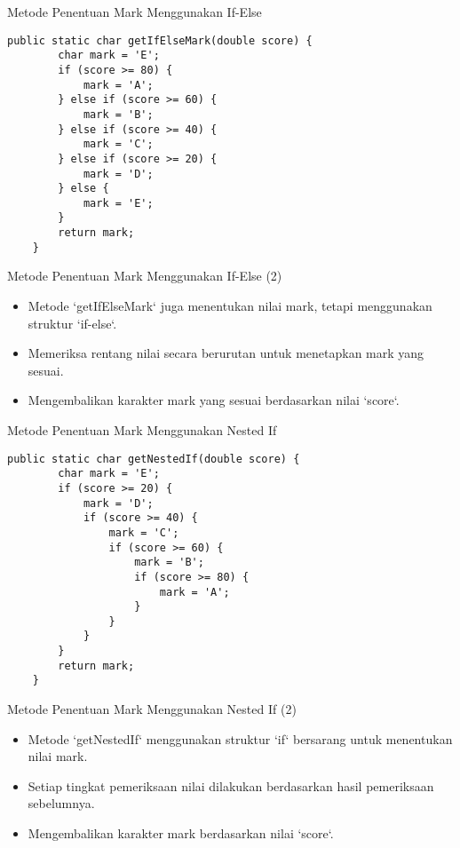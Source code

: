\documentclass[aspectratio=169, table]{beamer}
\begin{document}
\begin{frame}[fragile]{\Large{Metode Penentuan Mark Menggunakan If-Else}}
\vspace{20pt}
\begin{lstlisting}[style=JavaStyle]
	public static char getIfElseMark(double score) {
		char mark = 'E';
		if (score >= 80) {
			mark = 'A';
		} else if (score >= 60) {
			mark = 'B';
		} else if (score >= 40) {
			mark = 'C';
		} else if (score >= 20) {
			mark = 'D';
		} else {
			mark = 'E';
		}
		return mark;
	}
\end{lstlisting}
\end{frame}

\begin{frame}[fragile]{\Large{Metode Penentuan Mark Menggunakan If-Else (2)}}
\vspace{20pt}
\begin{itemize}
	\item Metode `getIfElseMark` juga menentukan nilai mark, tetapi menggunakan struktur `if-else`.
	\item Memeriksa rentang nilai secara berurutan untuk menetapkan mark yang sesuai.
	\item Mengembalikan karakter mark yang sesuai berdasarkan nilai `score`.
\end{itemize}
\end{frame}

\begin{frame}[fragile]{\Large{Metode Penentuan Mark Menggunakan Nested If}}
\vspace{20pt}
\begin{lstlisting}[style=JavaStyle]
	public static char getNestedIf(double score) {
		char mark = 'E';
		if (score >= 20) {
			mark = 'D';
			if (score >= 40) {
				mark = 'C';
				if (score >= 60) {
					mark = 'B';
					if (score >= 80) {
						mark = 'A';
					}
				}
			}
		}
		return mark;
	}
\end{lstlisting}
\end{frame}

\begin{frame}[fragile]{\Large{Metode Penentuan Mark Menggunakan Nested If (2)}}
\begin{itemize}
	\item Metode `getNestedIf` menggunakan struktur `if` bersarang untuk menentukan nilai mark.
	\item Setiap tingkat pemeriksaan nilai dilakukan berdasarkan hasil pemeriksaan sebelumnya.
	\item Mengembalikan karakter mark berdasarkan nilai `score`.
\end{itemize}
\end{frame}
\end{document}
